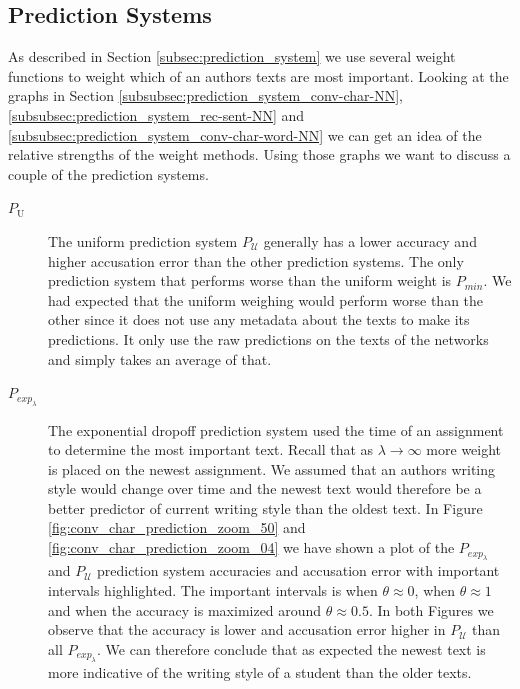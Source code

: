 \subsection{Prediction Systems}

As described in Section \ref{subsec:prediction_system} we use several weight
functions to weight which of an authors texts are most important. Looking
at the graphs in Section \ref{subsubsec:prediction_system_conv-char-NN},
\ref{subsubsec:prediction_system_rec-sent-NN} and
\ref{subsubsec:prediction_system_conv-char-word-NN} we can get an idea of the
relative strengths of the weight methods. Using those graphs we want to discuss
a couple of the prediction systems.

\begin{description}

    \item[$P_\mathrm{U}$]

        The uniform prediction system $P_\mathcal{U}$ generally has a lower
        accuracy and higher accusation error than the other prediction systems.
        The only prediction system that performs worse than the uniform weight
        is $P_{min}$. We had expected that the uniform weighing would perform
        worse than the other since it does not use any metadata about the texts
        to make its predictions. It only use the raw predictions on the texts of
        the networks and simply takes an average of that.

    \item[$P_{exp_\lambda}$]

        The exponential dropoff prediction system used the time of an
        assignment to determine the most important text. Recall that
        as $\lambda \rightarrow \infty$ more weight is placed on the
        newest assignment. We assumed that an authors writing style
        would change over time and the newest text would therefore be
        a better predictor of current writing style than the oldest
        text. In Figure \ref{fig:conv_char_prediction_zoom_50} and
        \ref{fig:conv_char_prediction_zoom_04} we have shown a plot of the
        $P_{exp_\lambda}$ and $P_\mathcal{U}$ prediction system accuracies and
        accusation error with important intervals highlighted. The important
        intervals is when $\theta \approx 0$, when $\theta \approx 1$ and when
        the accuracy is maximized around $\theta \approx 0.5$. In both Figures
        we observe that the accuracy is lower and accusation error higher in
        $P_\mathcal{U}$ than all $P_{exp_\lambda}$. We can therefore conclude
        that as expected the newest text is more indicative of the writing style
        of a student than the older texts.


\end{description}
